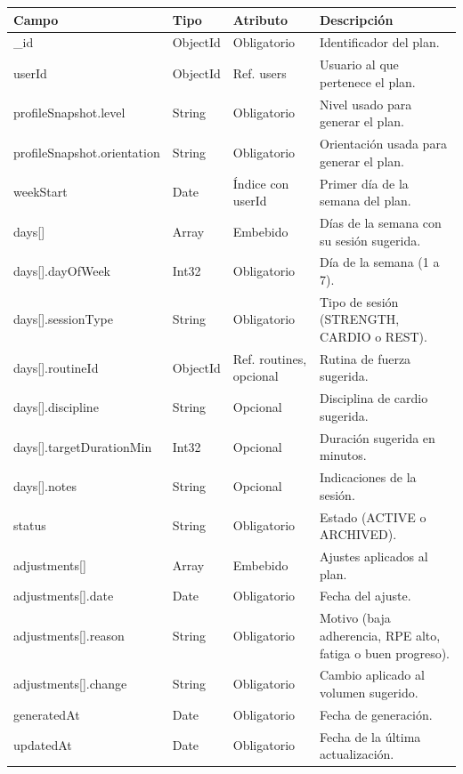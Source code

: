 {\footnotesize
\renewcommand{\arraystretch}{1.2}
\begin{longtable}{|>{\raggedright\arraybackslash}p{4.7cm}|>{\raggedright\arraybackslash}p{1.8cm}|>{\raggedright\arraybackslash}p{2.3cm}|>{\raggedright\arraybackslash}p{5.4cm}|}
    \hline
    \rowcolor[HTML]{EFEFEF}
    \textbf{Campo} & \textbf{Tipo} & \textbf{Atributo} & \textbf{Descripción} \\ \hline
    \endhead
    \_id & ObjectId & Obligatorio & Identificador del plan. \\ \hline
    userId & ObjectId & Ref. users & Usuario al que pertenece el plan. \\ \hline
    profileSnapshot.\allowbreak level & String & Obligatorio & Nivel usado para generar el plan. \\ \hline
    profileSnapshot.\allowbreak orientation & String & Obligatorio & Orientación usada para generar el plan. \\ \hline
    weekStart & Date & Índice con userId & Primer día de la semana del plan. \\ \hline
    days[]\allowbreak  & Array & Embebido & Días de la semana con su sesión sugerida. \\ \hline
    days[]\allowbreak .\allowbreak dayOfWeek & Int32 & Obligatorio & Día de la semana (1 a 7). \\ \hline
    days[]\allowbreak .\allowbreak sessionType & String & Obligatorio & Tipo de sesión (STRENGTH, CARDIO o REST). \\ \hline
    days[]\allowbreak .\allowbreak routineId & ObjectId & Ref. routines, opcional & Rutina de fuerza sugerida. \\ \hline
    days[]\allowbreak .\allowbreak discipline & String & Opcional & Disciplina de cardio sugerida. \\ \hline
    days[]\allowbreak .\allowbreak targetDurationMin & Int32 & Opcional & Duración sugerida en minutos. \\ \hline
    days[]\allowbreak .\allowbreak notes & String & Opcional & Indicaciones de la sesión. \\ \hline
    status & String & Obligatorio & Estado (ACTIVE o ARCHIVED). \\ \hline
    adjustments[]\allowbreak  & Array & Embebido & Ajustes aplicados al plan. \\ \hline
    adjustments[]\allowbreak .\allowbreak date & Date & Obligatorio & Fecha del ajuste. \\ \hline
    adjustments[]\allowbreak .\allowbreak reason & String & Obligatorio & Motivo (baja adherencia, RPE alto, fatiga o buen progreso). \\ \hline
    adjustments[]\allowbreak .\allowbreak change & String & Obligatorio & Cambio aplicado al volumen sugerido. \\ \hline
    generatedAt & Date & Obligatorio & Fecha de generación. \\ \hline
    updatedAt & Date & Obligatorio & Fecha de la última actualización. \\ \hline
\end{longtable}
}
